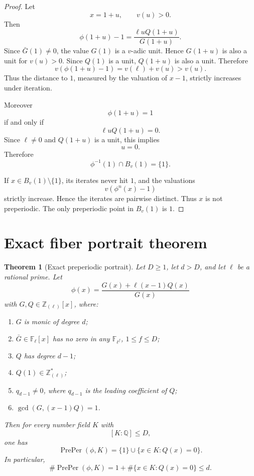 \documentclass[11pt]{article}
\newtheorem{theorem}{Theorem}[section]
\begin{document}
\begin{proof}
Let
\[
x=1+u,
\qquad
v(u)>0.
\]
Then
\[
\phi(1+u)-1
=
\frac{\ell u Q(1+u)}{G(1+u)}.
\]
Since \(\bar G(1)\ne0\), the value \(G(1)\) is a \(v\)-adic unit. Hence \(G(1+u)\) is also a unit for \(v(u)>0\). Since \(Q(1)\) is a unit, \(Q(1+u)\) is also a unit. Therefore
\[
v(\phi(1+u)-1)=v(\ell)+v(u)>v(u).
\]
Thus the distance to \(1\), measured by the valuation of \(x-1\), strictly increases under iteration.

Moreover
\[
\phi(1+u)=1
\]
if and only if
\[
\ell u Q(1+u)=0.
\]
Since \(\ell\ne0\) and \(Q(1+u)\) is a unit, this implies
\[
u=0.
\]
Therefore
\[
\phi^{-1}(1)\cap B_v(1)=\{1\}.
\]

If \(x\in B_v(1)\setminus\{1\}\), its iterates never hit \(1\), and the valuations
\[
v(\phi^n(x)-1)
\]
strictly increase. Hence the iterates are pairwise distinct. Thus \(x\) is not preperiodic. The only preperiodic point in \(B_v(1)\) is \(1\).
\end{proof}

\section{Exact fiber portrait theorem}

\begin{theorem}[Exact preperiodic portrait]
Let \(D\ge1\), let \(d>D\), and let \(\ell\) be a rational prime. Let
\[
\phi(x)=\frac{G(x)+\ell(x-1)Q(x)}{G(x)}
\]
with \(G,Q\in\mathbb Z_{(\ell)}[x]\), where:
\begin{enumerate}
\item \(G\) is monic of degree \(d\);
\item \(\bar G\in\mathbb F_\ell[x]\) has no zero in any \(\mathbb F_{\ell^f}\), \(1\le f\le D\);
\item \(Q\) has degree \(d-1\);
\item \(Q(1)\in\mathbb Z_{(\ell)}^\ast\);
\item \(q_{d-1}\ne0\), where \(q_{d-1}\) is the leading coefficient of \(Q\);
\item \(\gcd(G,(x-1)Q)=1\).
\end{enumerate}
Then for every number field \(K\) with
\[
[K:\mathbb Q]\le D,
\]
one has
\[
\operatorname{PrePer}(\phi,K)
=
\{1\}\cup\{x\in K:Q(x)=0\}.
\]
In particular,
\[
\#\operatorname{PrePer}(\phi,K)
=
1+\#\{x\in K:Q(x)=0\}
\le d.
\]
\end{theorem}
\end{document}

